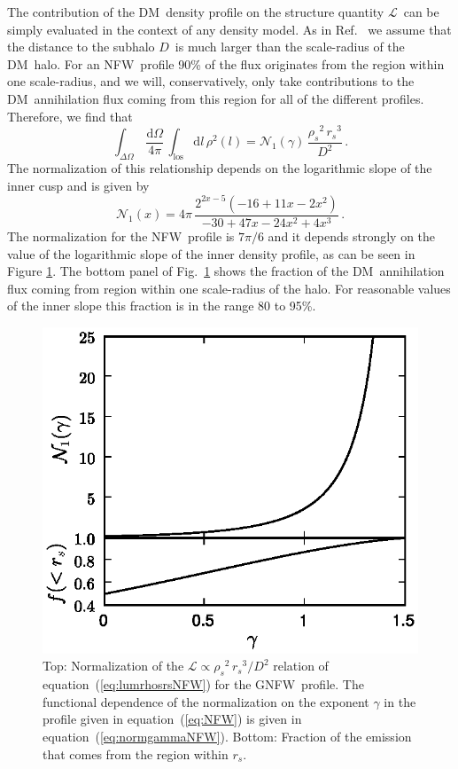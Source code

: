 \documentclass[aps,prd,twocolumn,amsmath,amssymb,floatfix,nofootinbib,10pt]{revtex4}
\newcommand{\NFW}{NFW}
\newcommand{\GNFW}{G\NFW}
\newcommand{\DM}{DM}
\newcommand{\dd}{\mathrm{d}}
\newcommand{\eqnname}{equation}
\newcommand{\los}{los}
\newcommand{\lum}{\ensuremath{\mathcal{L}}}
\newcommand{\rhos}{\ensuremath{\rho_s}}
\newcommand{\rs}{\ensuremath{r_s}}
\newcommand{\dist}{\ensuremath{D}}
\newcommand{\norm}{\ensuremath{\mathcal{N}}}
\newcommand{\normnfw}{\ensuremath{\norm_1}}
\begin{document}
The contribution of the \DM\ density profile on the structure quantity
\lum\ can be simply evaluated in the context of any density model. As
in Ref.~\cite{2007PhRvD..75h3526S} we assume that the distance to the
subhalo \dist\ is much larger than the scale-radius of the \DM\
halo. For an \NFW\ profile 90\% of the flux originates from the region
within one scale-radius, and we will, conservatively, only take
contributions to the \DM\ annihilation flux coming from this region
for all of the different profiles. Therefore, we find that
\begin{equation}\label{eq:lumrhosrsNFW}
\int_{\Delta\Omega}\,\frac{\dd\Omega}{4\pi}\,\int_{\mathrm{\los}} \dd
l\, \rho^2(l)= \normnfw(\gamma)\, \frac{\rhos^2\, \rs^3}{\dist^2}\, .
\end{equation}
The normalization of this relationship depends on the logarithmic
slope of the inner cusp and is given by
\begin{equation}\label{eq:normgammaNFW}
\normnfw(x) = 4 \pi  \, \frac{2^{2x-5}\left(-16+11x-2x^2\right)}{-30+47x-24x^2+4x^3}\, .
\end{equation}
The normalization for the \NFW\ profile is $7\pi/6$ and it depends
strongly on the value of the logarithmic slope of the inner density
profile, as can be seen in Figure \ref{fig:normgammaNFW}. The bottom
panel of Fig.~\ref{fig:normgammaNFW} shows the fraction of the \DM\
annihilation flux coming from region within one scale-radius of the
halo. For reasonable values of the inner slope this fraction is in the
range 80 to 95\%.

\begin{figure}[t]
\centering
\includegraphics{normgammaNFW.eps}
\caption{Top: Normalization of the $\lum \propto \rhos^2\,
\rs^3/\dist^2$ relation of \eqnname\ (\ref{eq:lumrhosrsNFW}) for the
\GNFW\ profile. The functional dependence of the normalization on the
exponent $\gamma$ in the profile given in \eqnname\ (\ref{eq:NFW}) is
given in \eqnname\ (\ref{eq:normgammaNFW}). Bottom: Fraction of the
emission that comes from the region within \rs.}%
\label{fig:normgammaNFW}%
\end{figure}
\end{document}
